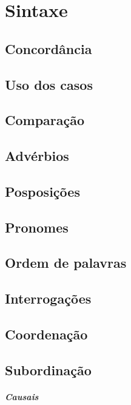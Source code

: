 
\chapter{Sintaxe}

\section{Concordância}

\section{Uso dos casos}

\section{Comparação}

\section{Advérbios}

\section{Posposições}

\section{Pronomes}

\section{Ordem de palavras}

\section{Interrogações}

\section{Coordenação}

\section{Subordinação}

\paragraph{Causais}

